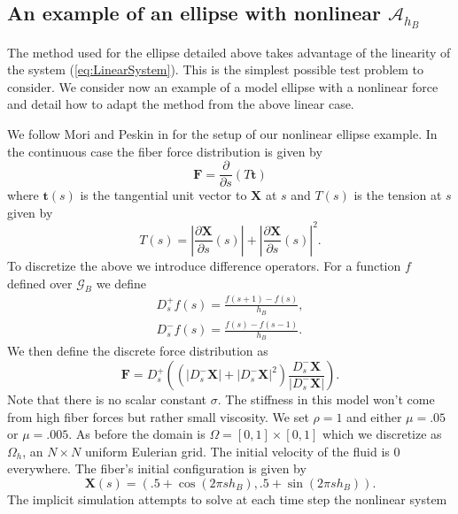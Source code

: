 \documentclass[preprint,12pt]{elsarticle}
\begin{document}
\subsection{An example of an ellipse with nonlinear $\mathcal{A}_{h_B}$}
The method used for the ellipse detailed above takes advantage of the linearity of the system (\ref{eq:LinearSystem}). This is the simplest possible test problem to consider. We consider now an example of a model ellipse with a nonlinear force and detail how to adapt the method from the above linear case.

We follow Mori and Peskin in \cite{MP2008} for the setup of our nonlinear ellipse example. In the continuous case the fiber force distribution is given by
\begin{equation}
\mathbf{F} = \frac{\partial}{\partial s} (T\mathbf{t})
\end{equation}
where $\mathbf{t}(s)$ is the tangential unit vector to $\mathbf{X}$ at $s$ and $T(s)$ is the tension at $s$ given by
\begin{equation}
T(s) = \left| \frac{\partial\mathbf{X}}{\partial s}(s) \right|
 +     \left| \frac{\partial\mathbf{X}}{\partial s}(s) \right|^2.
\end{equation}
To discretize the above we introduce difference operators. For a function $f$ defined over $\mathcal{G}_B$ we define
\begin{eqnarray}
D_s^+f(s) = \frac{f(s+1)-f(s)}{h_B},\\
D_s^-f(s) = \frac{f(s)-f(s-1)}{h_B}.
\end{eqnarray}
We then define the discrete force distribution as
\begin{equation}
\mathbf{F} = D_s^+ \left(\left(
\left| D_s^-\mathbf{X} \right| +
\left| D_s^-\mathbf{X} \right|^2 \right)
\frac{ D_s^-\mathbf{X} }{ \left| D_s^-\mathbf{X} \right| } \right).
\end{equation}
Note that there is no scalar constant $\sigma$. The stiffness in this model won't come from high fiber forces but rather small viscosity. We set $\rho = 1$ and either $\mu = .05$ or $\mu = .005$. As before the domain is $\Omega = [0,1]\times[0,1]$ which we discretize as $\Omega_h$, an $N\times N$ uniform Eulerian grid. The initial velocity of the fluid is $0$ everywhere. The fiber's initial configuration is given by
\begin{equation}
\mathbf{X}(s) = (.5 + \cos(2\pi sh_B), .5 + \sin(2\pi sh_B)).
\end{equation}
The implicit simulation attempts to solve at each time step the nonlinear system
\end{document}
